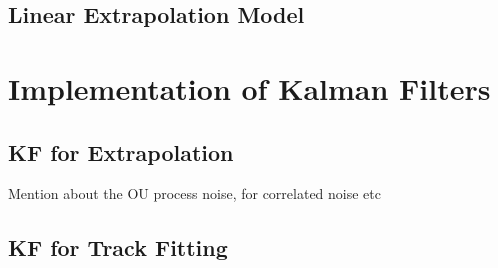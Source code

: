 \subsection{Linear Extrapolation Model}


\section{Implementation of Kalman Filters}
\label{gnn-kf-implementation}

\subsection{KF for Extrapolation}
Mention about the OU process noise, for correlated noise etc

\subsection{KF for Track Fitting}


